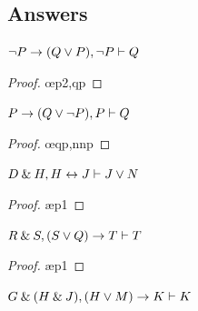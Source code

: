 {{{{{{{{{\begin{small}




\section{Answers}
\setcounter{ProbPart}{0}

\problempart
\begin{earg}
\item ${\neg} P \rightarrow (Q \vee P), {\neg} P \vdash Q$
\begin{proof}
	 \pr{}
	 \pr{}
	 
	 \oe{p2,qp}
\end{proof}
\medskip


\noindent\begin{minipage}{0.99\textwidth}
\item $P \rightarrow (Q \vee {\neg} P), P \vdash Q$
\begin{proof}
	 \pr{}
	 \pr{}
	 
	  
	 \oe{qp,nnp}
\end{proof}
\end{minipage}
\medskip


\item $D \mathbin{\&} H, H \leftrightarrow J  \vdash J \vee N$ 
\begin{proof}
	 \pr{}
	 \pr{}
	 \ae{p1}
	 
	 
\end{proof}
\medskip


\item $R \mathbin{\&} S, (S \vee Q) \rightarrow T \vdash T$
\begin{proof}
	 \pr{}
	 \pr{}
	 \ae{p1}
	 
	 
\end{proof}
\medskip

\item $G \mathbin{\&} (H \mathbin{\&} J), (H \vee M) \rightarrow K \vdash K$
\smallskip


\end{earg}
\end{small}}}}}}}}}}
